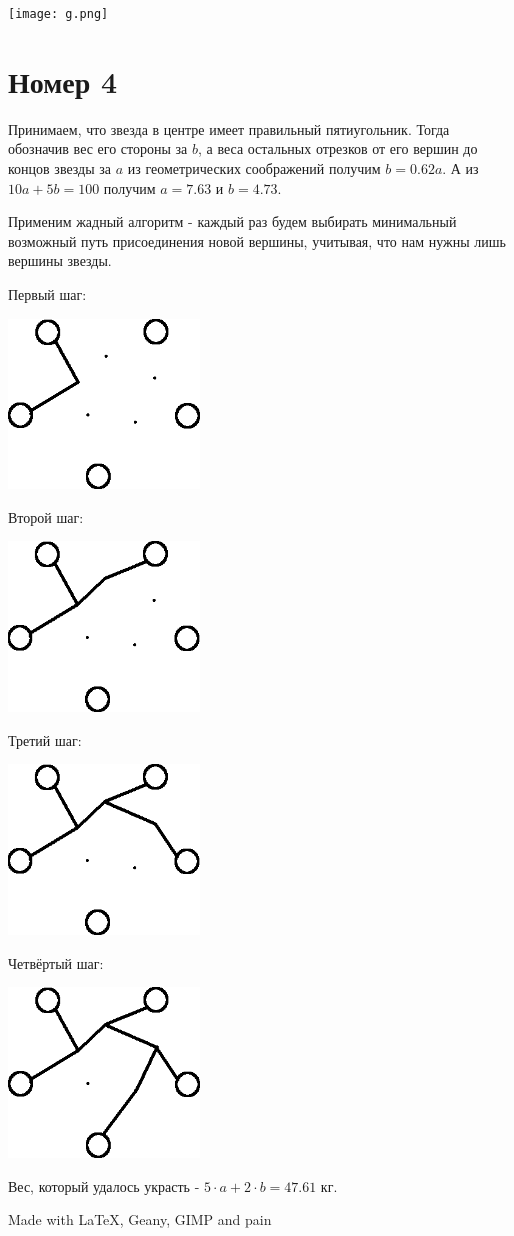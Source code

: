 \documentclass[a4paper,12pt]{article}
\begin{document}
\begin{flushleft}
\texttt{[image: g.png]} 

\section{Номер 4}

Принимаем, что звезда в центре имеет правильный пятиугольник. Тогда обозначив
вес его стороны за $b$, а веса остальных отрезков от его вершин до концов звезды
за $a$ из геометрических соображений получим $b = 0.62a$. А из $10a + 5b = 100$
получим $a = 7.63$ и $b = 4.73$.

Применим жадный алгоритм - каждый раз будем выбирать минимальный возможный
путь присоединения новой вершины, учитывая, что нам нужны лишь вершины звезды.

Первый шаг:

\includegraphics[width=2in]{1.png} 

Второй шаг:

\includegraphics[width=2in]{2.png} 

Третий шаг:

\includegraphics[width=2in]{3.png} 

Четвёртый шаг:

\includegraphics[width=2in]{4.png} 

Вес, который удалось украсть - $5 \cdot a + 2 \cdot b = 47.61$ кг.

\end{flushleft}
\begin{center}
Made with \LaTeX{}, Geany, GIMP and pain
\end{center}
\end{document}
